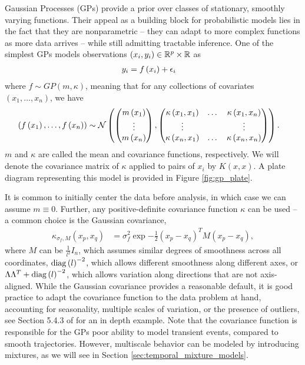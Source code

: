 Gaussian Processes (GPs) provide a prior over classes of stationary, smoothly
varying functions. Their appeal as a building block for probabilistic models
lies in the fact that they are nonparametric -- they can adapt to more complex
functions as more data arrives -- while still admitting tractable inference. One
of the simplest GPs models observations $\left(x_{i}, y_{i}\right) \in
\mathbb{R}^{p}\times \mathbb{R}$ as
\begin{align*}
  y_{i} &= f\left(x_{i}\right) + \epsilon_{i}
\end{align*}
where $f \sim GP\left(m, \kappa\right)$, meaning that for any collections of
covariates $\left(x_{1}, \dots, x_{n}\right)$, we have
\begin{align*}
  \left(f\left(x_{1}\right), \dots, f\left(x_{n}\right)\right) &\sim
  \mathcal{N}\left( \begin{pmatrix} m\left(x_{1}\right) \\ \vdots \\ m\left(x_{n}\right) \end{pmatrix}, \begin{pmatrix} \kappa\left(x_{1}, x_{1}\right) & \dots & \kappa\left(x_{1}, x_{n}\right) \\ \vdots & & \vdots \\ \kappa\left(x_{n}, x_{1}\right) & \dots &\kappa\left(x_{n}, x_{n}\right) \end{pmatrix}\right).
\end{align*}
$m$ and $\kappa$ are called the mean and covariance functions, respectively. We
will denote the covariance matrix of $\kappa$ applied to pairs of $x_{i}$ by
$K\left(x, x\right)$. A plate diagram representing this model is provided in
Figure \ref{fig:gp_plate}.

It is common to initially center the data before analysis, in which case we can
assume $m \equiv 0$. Further, any positive-definite covariance function $\kappa$
can be used -- a common choice is the Gaussian covariance,
\begin{align*}
\kappa_{\sigma_{f}, M}\left(x_{p}, x_{q}\right) &= \sigma_{f}^{2}\exp{-\frac{1}{2}\left(x_{p} - x_{q}\right)^{T}M\left(x_{p} - x_{q}\right)},
\end{align*}
where $M$ can be $\frac{1}{l^{2}}I_{n}$, which assumes similar degrees of
smoothness across all coordinates, $\mathop\mathrm{diag}\left(l\right)^{-2}$, which allows
different smoothness along different axes, or $\Lambda \Lambda^{T} +
\mathop\mathrm{diag}\left(l\right)^{-2}$, which allows variation along directions that are not
axis-aligned. While the Gaussian covariance provides a reasonable default, it is
good practice to adapt the covariance function to the data problem at hand,
accounting for seasonality, multiple scales of variation, or the presence of
outliers, see Section 5.4.3 of \citep{rasmussen2006gaussian} for an in depth
example. Note that the covariance function is responsible for the GPs poor
ability to model transient events, compared to smooth trajectories. However,
multiscale behavior can be modeled by introducing mixtures, as we will see in
Section \ref{sec:temporal_mixture_models}.

